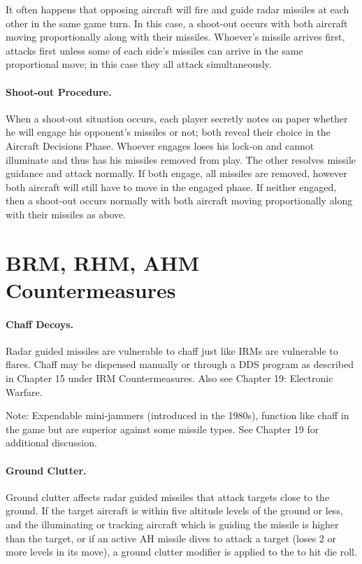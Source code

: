 It often happens that opposing aircraft will fire and guide radar missiles at each other in the same game turn. In this case, a shoot-out occurs with both aircraft moving proportionally along with their missiles. Whoever’s missile arrives first, attacks first unless some of each side's missiles can arrive in the same proportional move; in this case they all attack simultaneously.

\paragraph{Shoot-out Procedure.} When a shoot-out situation occurs, each player secretly notes on paper whether he will engage his opponent's missiles or not; both reveal their choice in the Aircraft Decisions Phase. Whoever engages loses his lock-on and cannot illuminate and thus has his missiles removed from play. The other resolves missile guidance and attack normally. If both engage, all missiles are removed, however both aircraft will still have to move in the engaged phase. If neither engaged, then a shoot-out occurs normally with both aircraft moving proportionally along with their missiles as above.

\section{BRM, RHM, AHM Countermeasures}

\paragraph{Chaff Decoys.} Radar guided missiles are vulnerable to chaff just like IRMs are vulnerable to flares. Chaff may be dispensed manually or through a DDS program as described in Chapter 15 under IRM Countermeasures. Also see Chapter 19: Electronic Warfare.

Note: Expendable mini-jammers (introduced in the 1980s), function like chaff in the game but are superior against some missile types. See Chapter 19 for additional discussion.

\paragraph{Ground Clutter.}\label{rule:rgm-ground-clutter} Ground clutter affects radar guided missiles that attack targets close to the ground. If the target aircraft is within five altitude levels of the ground or less, and the illuminating or tracking aircraft which is guiding the missile is higher than the target, or if an active AH missile dives to attack a target (loses 2 or more levels in its move), a ground clutter modifier is applied to the to hit die roll.

